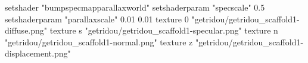 setshader "bumpspecmapparallaxworld"
setshaderparam "specscale" 0.5
setshaderparam "parallaxscale" 0.01 0.01
texture 0 "getridou/getridou_scaffold1-diffuse.png"
texture s "getridou/getridou_scaffold1-specular.png"
texture n "getridou/getridou_scaffold1-normal.png"
texture z "getridou/getridou_scaffold1-displacement.png"
